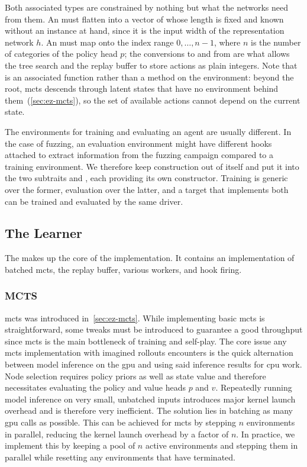 Both associated types are constrained by nothing but what the networks need
from them.
An  must flatten into a vector of  whose length is
fixed and known without an instance at hand, since it is the input width of the
representation network $h$.
An  must map onto the index range $0, \dots, n - 1$, where $n$ is
the number of categories of the policy head $p$; the conversions to and from
 are what allows the tree search and the replay buffer to store
actions as plain integers.
Note that  is an associated function rather than a method
on the environment: beyond the root, \gls{mcts} descends through latent states
that have no environment behind them~(\cref{sec:ez-mcts}), so the set of
available actions cannot depend on the current state.

The environments for training and evaluating an agent are usually
different.
In the case of fuzzing, an evaluation environment might have different hooks
attached to extract information from the fuzzing campaign compared to a
training environment.
We therefore keep construction out of  itself and put it into
the two subtraits  and ,
each providing its own constructor.
Training is generic over the former, evaluation over the latter, and a target
that implements both can be trained and evaluated by the same driver.

\subsection{The Learner}

The  makes up the core of the implementation.
It contains an implementation of batched \gls{mcts}, the replay buffer, various
workers, and hook firing.

\subsubsection{MCTS}

\gls{mcts} was introduced in~\cref{sec:ez-mcts}.
While implementing basic \gls{mcts} is straightforward, some tweaks must be
introduced to guarantee a good throughput since \gls{mcts} is the main bottleneck of
training and self-play.
The core issue any \gls{mcts} implementation with imagined rollouts encounters
is the quick alternation between model inference on the \gls{gpu} and using said inference
results for \gls{cpu} work.
Node selection requires policy priors as well as state value and therefore
necessitates evaluating the policy and value heads $p$ and $v$.
Repeatedly running model inference on very small, unbatched inputs introduces major
kernel launch overhead and is therefore very inefficient.
The solution lies in batching as many \gls{gpu} calls as possible.
This can be achieved for \gls{mcts} by stepping $n$ environments in parallel,
reducing the kernel launch overhead by a factor of $n$.
In practice, we implement this by keeping a pool of $n$ active environments and stepping
them in parallel while resetting any environments that have terminated.

